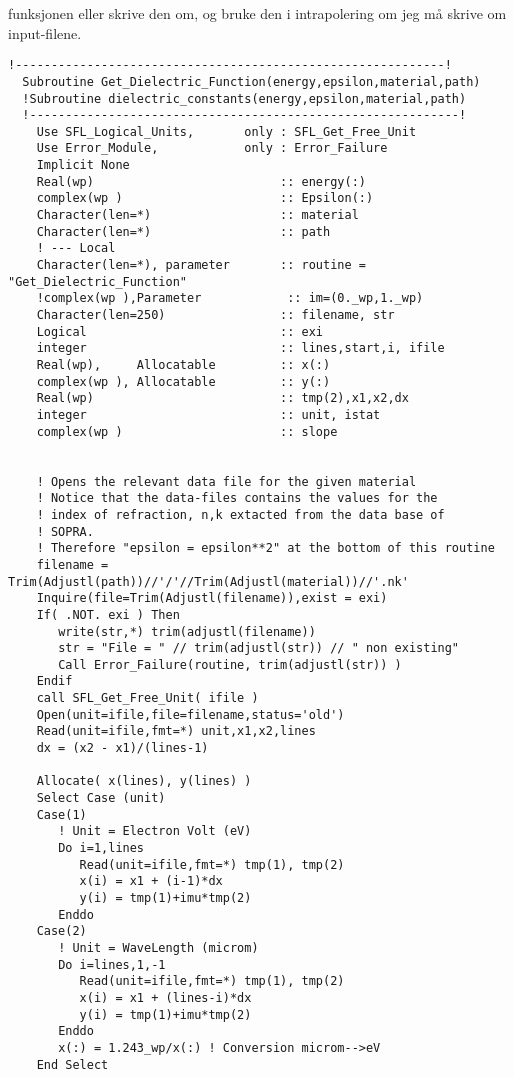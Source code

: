 funksjonen eller skrive den om, og bruke den i intrapolering om jeg må skrive om input-filene.
\begin{lstlisting}[style=FormattedNumber, language=FORTRAN]
  !------------------------------------------------------------!
  Subroutine Get_Dielectric_Function(energy,epsilon,material,path)
  !Subroutine dielectric_constants(energy,epsilon,material,path)
  !------------------------------------------------------------!
    Use SFL_Logical_Units,       only : SFL_Get_Free_Unit
    Use Error_Module,            only : Error_Failure
    Implicit None
    Real(wp)                          :: energy(:)
    complex(wp )                      :: Epsilon(:)
    Character(len=*)                  :: material
    Character(len=*)                  :: path
    ! --- Local
    Character(len=*), parameter       :: routine = "Get_Dielectric_Function"
    !complex(wp ),Parameter            :: im=(0._wp,1._wp)
    Character(len=250)                :: filename, str
    Logical                           :: exi
    integer                           :: lines,start,i, ifile
    Real(wp),     Allocatable         :: x(:)
    complex(wp ), Allocatable         :: y(:)
    Real(wp)                          :: tmp(2),x1,x2,dx
    integer                           :: unit, istat
    complex(wp )                      :: slope
    

    ! Opens the relevant data file for the given material
    ! Notice that the data-files contains the values for the 
    ! index of refraction, n,k extacted from the data base of
    ! SOPRA.
    ! Therefore "epsilon = epsilon**2" at the bottom of this routine    
    filename = Trim(Adjustl(path))//'/'//Trim(Adjustl(material))//'.nk'
    Inquire(file=Trim(Adjustl(filename)),exist = exi)
    If( .NOT. exi ) Then
       write(str,*) trim(adjustl(filename))
       str = "File = " // trim(adjustl(str)) // " non existing" 
       Call Error_Failure(routine, trim(adjustl(str)) )
    Endif
    call SFL_Get_Free_Unit( ifile )
    Open(unit=ifile,file=filename,status='old')
    Read(unit=ifile,fmt=*) unit,x1,x2,lines
    dx = (x2 - x1)/(lines-1)

    Allocate( x(lines), y(lines) )
    Select Case (unit)
    Case(1)
       ! Unit = Electron Volt (eV)
       Do i=1,lines 
          Read(unit=ifile,fmt=*) tmp(1), tmp(2)
          x(i) = x1 + (i-1)*dx
          y(i) = tmp(1)+imu*tmp(2)
       Enddo
    Case(2)
       ! Unit = WaveLength (microm)
       Do i=lines,1,-1 
          Read(unit=ifile,fmt=*) tmp(1), tmp(2)
          x(i) = x1 + (lines-i)*dx
          y(i) = tmp(1)+imu*tmp(2)
       Enddo
       x(:) = 1.243_wp/x(:) ! Conversion microm-->eV
    End Select


\end{lstlisting}
